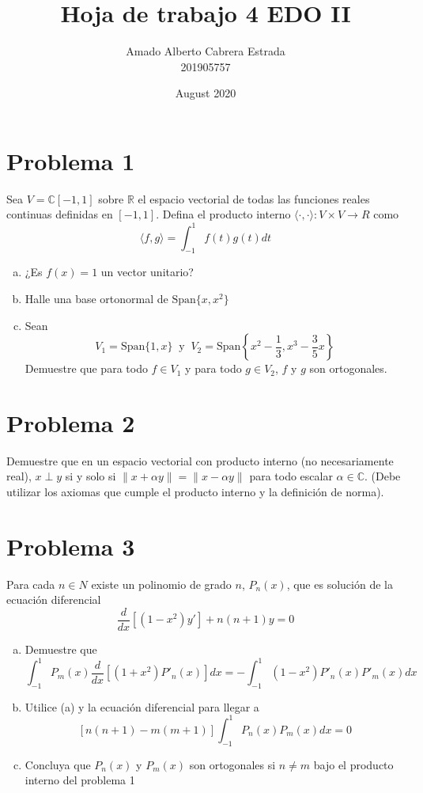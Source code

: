 \documentclass{article}
\title{Hoja de trabajo 4 EDO II}
\author{Amado Alberto Cabrera Estrada\\
201905757}
\date{August 2020}
\begin{document}
\maketitle

\section*{Problema 1}
Sea $V = \mathds{C}[-1, 1]$ sobre $\mathds{R}$ el espacio vectorial de todas las funciones reales continuas definidas en $[-1, 1]$. Defina el producto interno $\langle\cdot,\cdot\rangle:V \times V \to R$ como
\[ \langle f,g\rangle=\int_{-1}^{1} f(t)g(t)dt \]
\begin{enumerate}[a)]
    \item ¿Es $f(x)=1$ un vector unitario?
    
    \item Halle una base ortonormal de $\text{Span}\{x,x^2\}$
    
    \item Sean
    \[ V_1=\text{Span}\{1,x\} \ \text{ y } \ V_2=\text{Span}\left\{x^2-\frac{1}{3},x^3-\frac{3}{5}x\right\} \]
    Demuestre que para todo $f\in V_1$ y para todo $g\in V_2$, $f$ y $g$ son ortogonales.
\end{enumerate}

\section*{Problema 2}
Demuestre que en un espacio vectorial con producto interno (no necesariamente real), $x \perp y$ si y solo si $\|x+\alpha y\|=\|x-\alpha y\|$ para todo escalar $\alpha\in\mathds{C}$. (Debe utilizar los axiomas que cumple el producto interno y la definición de norma).

\section*{Problema 3}
Para cada $n\in N$ existe un polinomio de grado $n$, $P_n(x)$, que es solución de la ecuación diferencial
\[ \frac{d}{dx}\left[(1-x^2)y'\right]+n(n+1)y=0 \]
\begin{enumerate}[a)]
    \item Demuestre que
    \[ \int_{-1}^{1}P_{m}(x)\frac{d}{dx}[(1+x^2)P'_{n}(x)]dx = -\int_{-1}^{1}(1-x^2)P'_{n}(x)P'_{m}(x)dx \]
    
    \item Utilice (a) y la ecuación diferencial para llegar a
    \[ [n(n+1)-m(m+1)]\int_{-1}^{1}P_{n}(x)P_{m}(x)dx=0 \]
    
    \item Concluya que $P_{n}(x)$ y $P_{m}(x)$ son ortogonales si $n\neq m$ bajo el producto interno del problema 1
\end{enumerate}
\end{document}

